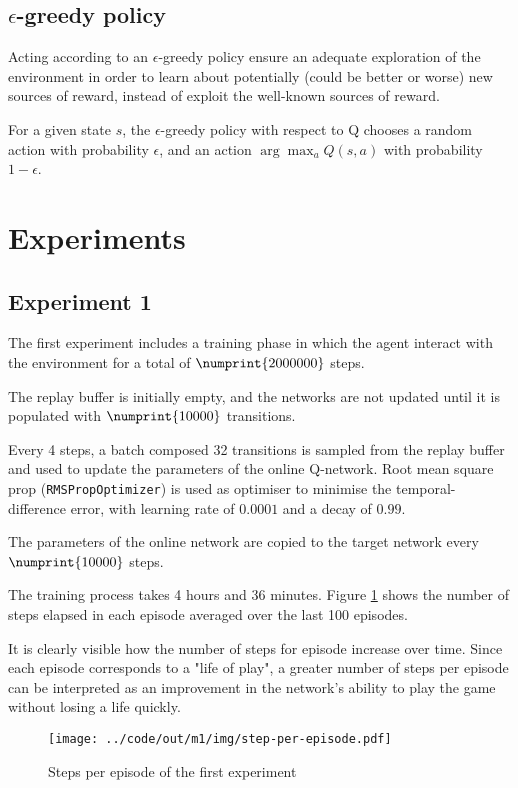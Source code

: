 \documentclass[a4paper,12pt]{article} %
\begin{document}
	\subsection*{$\epsilon$-greedy policy}
	
	Acting according to an $\epsilon$-greedy policy ensure an adequate exploration of the environment in order to learn about potentially (could be better or worse) new sources of reward, instead of exploit the well-known sources of reward.
	
	For a given state $s$, the $\epsilon$-greedy policy with respect to Q chooses a random action with probability $\epsilon$, and an action $\arg \max_a Q(s, a)$ with probability $1 - \epsilon$.
	
	\section{Experiments}
	\subsection*{Experiment 1}
	The first experiment includes a training phase in which the agent interact with the environment for a total of $\numprint{2000000}$ steps.
	
	The replay buffer is initially empty, and the networks are not updated until it is populated with $\numprint{10000}$ transitions. 
	
	Every 4 steps, a batch composed 32 transitions is sampled from the replay buffer and used to update the parameters of the online Q-network.
	Root mean square prop (\texttt{RMSPropOptimizer}) is used as optimiser to minimise the temporal-difference error, with learning rate of ${0.0001}$ and a decay of $0.99$. 
	
	The parameters of the online network are copied to the target network every $\numprint{10000}$ steps.
	\bigskip
	
	The training process takes 4 hours and 36 minutes. Figure \ref{fig:step-m1} shows the number of steps elapsed in each episode averaged over the last 100 episodes. 
	
	It is clearly visible how the number of steps for episode increase over time. Since each episode corresponds to a "life of play", a greater number of steps per episode can be interpreted as an improvement in the network's ability to play the game without losing a life quickly. 
	
	\begin{figure}[htb]
		\centering
		\texttt{[image: ../code/out/m1/img/step-per-episode.pdf]}	
		\caption{Steps per episode of the first experiment}
		\label{fig:step-m1}
	\end{figure}
	
\end{document}
